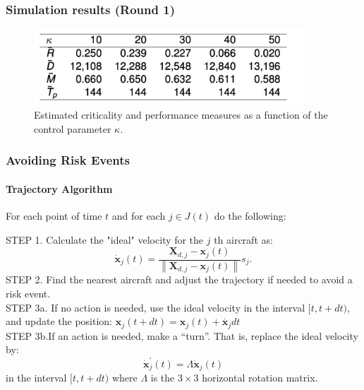 \documentclass[UKenglish]{beamer}
\begin{document}
\begin{frame}
\frametitle{Simulation results (Round 1)}
\vspace{5mm}
    \centering
    \begin{figure}
    \includegraphics[width=0.9\textwidth]{MathDept-images/simul_risk.png}
    \caption{Estimated criticality and performance measures as a function of the control parameter $\kappa$.}
    \end{figure}
\end{frame}
\begin{frame}
    \frametitle{Avoiding Risk Events}
    \framesubtitle{Trajectory Algorithm}
For each point of time $t$ and for each $j \in J(t)$ do the following:

STEP 1. Calculate the "ideal" velocity for the $j$ th aircraft as:
$$
\dot{\boldsymbol{x}}_j(t)=\frac{\boldsymbol{X}_{d, j}-\boldsymbol{x}_j(t)}{\left\|\boldsymbol{X}_{d, j}-\boldsymbol{x}_j(t)\right\|} s_j .
$$
\pause 
STEP 2. Find the nearest aircraft and adjust the trajectory if needed to avoid a risk event.
\vspace{2mm}\\
\pause
STEP 3a. If no action is needed, use the ideal velocity in the interval $[t, t+d t)$, and update the position: $\boldsymbol{x}_{j}(t + dt) = \boldsymbol{x}_{j}(t) + \dot{\boldsymbol{x}_{j}}dt$ \vspace{2mm}\\
\pause
STEP 3b.If an action is needed, make a “turn”. That is, replace the ideal velocity by:
$$\dot{\boldsymbol{x}}_j^{\prime}(t)=\Lambda \dot{\boldsymbol{x}}_j(t)$$ 
in the interval $[t, t+d t)$ where $\Lambda$ is the $3 \times 3$ horizontal rotation matrix.
\end{frame}
\end{document}
